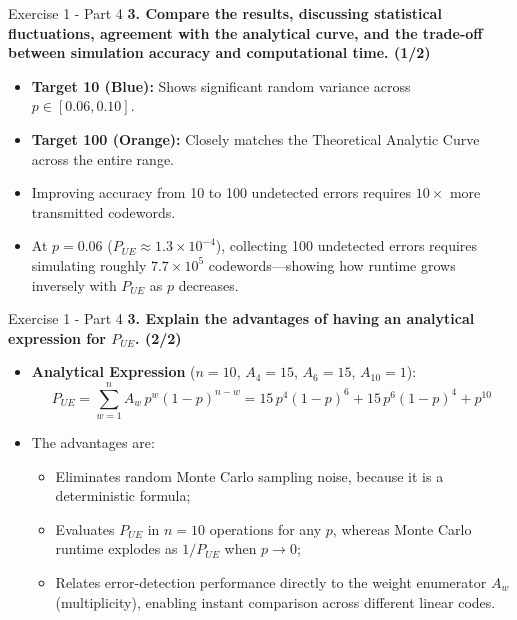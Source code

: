 \documentclass[10pt, aspectratio=169]{beamer}
\newcommand{\question}[1]{{\color{QuestionRed}\textbf{#1}}}
\begin{document}
\begin{frame}{Exercise 1 - Part 4}
  \question{3. Compare the results, discussing statistical fluctuations, agreement with the analytical curve, and the trade-off between simulation accuracy and computational time. (1/2)}

  \vspace{0.25cm}
  \begin{itemize}
    \item \textbf{Target 10 (Blue):} Shows significant random variance across $p \in [0.06, 0.10]$.
    \item \textbf{Target 100 (Orange):} Closely matches the Theoretical Analytic Curve across the entire range.
    \item Improving accuracy from 10 to 100 undetected errors requires $10\times$ more transmitted codewords.
    \item At $p = 0.06$ ($P_{UE} \approx 1.3 \times 10^{-4}$), collecting 100 undetected errors requires simulating roughly $7.7 \times 10^5$ codewords---showing how runtime grows inversely with $P_{UE}$ as $p$ decreases.
  \end{itemize}
\end{frame}

\begin{frame}{Exercise 1 - Part 4}
	\question{3. Explain the advantages of having an analytical expression for $P_{UE}$. (2/2)}
	
	\vspace{0.18cm}
	\begin{itemize}
		\item \textbf{Analytical Expression} ($n = 10$, $A_4 = 15$, $A_6 = 15$, $A_{10} = 1$):
		\[
		P_{UE} = \sum_{w=1}^{n} A_w \, p^w (1-p)^{n-w} = 15\,p^4(1-p)^6 + 15\,p^6(1-p)^4 + p^{10}
		\]
		\item The advantages are:
		\begin{itemize}
			\item Eliminates random Monte Carlo sampling noise, because it is a deterministic formula;
			\item Evaluates $P_{UE}$ in $n = 10$ operations for any $p$, whereas Monte Carlo runtime explodes as $1 / P_{UE}$ when $p \to 0$;
			\item Relates error-detection performance directly to the weight enumerator $A_w$ (multiplicity), enabling instant comparison across different linear codes.
		\end{itemize}
	\end{itemize}
\end{frame}
\end{document}

